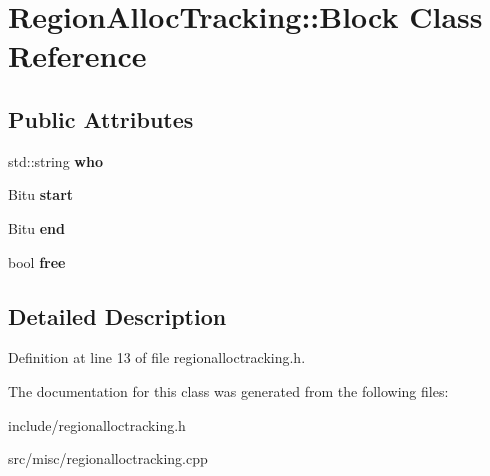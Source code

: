 \hypertarget{classRegionAllocTracking_1_1Block}{\section{Region\-Alloc\-Tracking\-:\-:Block Class Reference}
\label{classRegionAllocTracking_1_1Block}
}
\subsection*{Public Attributes}
\begin{DoxyCompactItemize}
\item 
\hypertarget{classRegionAllocTracking_1_1Block_a72ed7f684a1bb49327fa4b8f109ddfc9}{std\-::string {\bfseries who}}\label{classRegionAllocTracking_1_1Block_a72ed7f684a1bb49327fa4b8f109ddfc9}

\item 
\hypertarget{classRegionAllocTracking_1_1Block_a310d3de7018492b64fd7bac4cb640fb0}{Bitu {\bfseries start}}\label{classRegionAllocTracking_1_1Block_a310d3de7018492b64fd7bac4cb640fb0}

\item 
\hypertarget{classRegionAllocTracking_1_1Block_ab8aa00f0ccd051668d60b36b69f9477e}{Bitu {\bfseries end}}\label{classRegionAllocTracking_1_1Block_ab8aa00f0ccd051668d60b36b69f9477e}

\item 
\hypertarget{classRegionAllocTracking_1_1Block_a10cc004ce165b0bf7c42acd50419c9fd}{bool {\bfseries free}}\label{classRegionAllocTracking_1_1Block_a10cc004ce165b0bf7c42acd50419c9fd}

\end{DoxyCompactItemize}


\subsection{Detailed Description}


Definition at line 13 of file regionalloctracking.\-h.



The documentation for this class was generated from the following files\-:\begin{DoxyCompactItemize}
\item 
include/regionalloctracking.\-h\item 
src/misc/regionalloctracking.\-cpp\end{DoxyCompactItemize}
